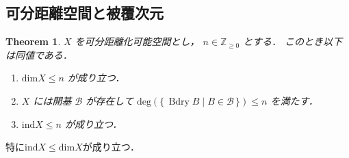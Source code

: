 \documentclass[leqno, a4paper, 12pt]{jsarticle}
\theoremstyle{plain}
\newtheorem{thm}{Theorem}[section]
\theoremstyle{definition}
\theoremstyle{remark}
\newcommand{\zz}{\mathbb{Z}}
\DeclareMathOperator{\bd}{\mathrm{Bdry}}
\newcommand{\yoind}{\mathrm{ind}}
\newcommand{\yodim}{\mathrm{dim}}
\newcommand{\yodeg}{\mathrm{deg}}
\numberwithin{equation}{section}
\begin{document}
\subsection{可分距離空間と被覆次元}\label{subsec:sepcovdim}



\begin{thm}\label{thm:sum:alphabetagamma}
$X$
を可分距離化可能空間とし，
$n\in \zz_{\ge 0}$
とする．
このとき以下は同値である．
\begin{enumerate}[label=\textup{(\arabic*)}]
\item \label{item:sum:gamma}
$\yodim X\le n$
が成り立つ．
\item\label{item:sum:alphal}
$X$
には開基
$\mathcal{B}$
が存在して
$\yodeg(\{\, \bd B\mid B\in \mathcal{B}\, \})\le n$
を満たす．
\item\label{item:sum:betal}
$\yoind X\le n$
が成り立つ．
\end{enumerate}
\end{thm}
特に$\yoind X\le \yodim X$が成り立つ．
\end{document}

